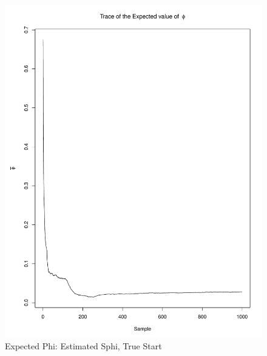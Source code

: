 \documentclass[11pt]{labbook}
\begin{document}
    \begin{figure}
        \centering
        \includegraphics[scale=.65]{FONSE_Plots/2016/November_9/estSphi_sim_expectedPhi}
        \caption{Expected Phi: Estimated Sphi, True Start}
        \label{fig:NOV9_E.S.EPHI}
    \end{figure}
\end{document}
